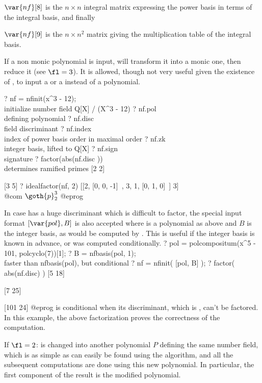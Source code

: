 $\var{nf}[8]$ is the $n\times n$ integral matrix expressing the power
basis in terms of the integral basis, and finally

$\var{nf}[9]$ is the $n\times n^2$ matrix giving the multiplication table
of the integral basis.

If a non monic polynomial is input,  will transform it into a
monic one, then reduce it (see $\fl=3$). It is allowed, though not very
useful given the existence of , to input a  or a
 instead of a polynomial.

\bprog
? nf = nfinit(x^3 - 12); \\ initialize number field Q[X] / (X^3 - 12)
? nf.pol   \\ defining polynomial
? nf.disc  \\ field discriminant
? nf.index \\ index of power basis order in maximal order
? nf.zk    \\ integer basis, lifted to Q[X]
? nf.sign  \\ signature
? factor(abs(nf.disc ))  \\ determines ramified primes
[2 2]

[3 5]
? idealfactor(nf, 2)
[[2, [0, 0, -1]~, 3, 1, [0, 1, 0]~] 3]  \\ @com $\goth{p}_2^3$
@eprog

In case  has a huge discriminant which is difficult to factor,
the special input format $[\var{pol},B]$ is also accepted where  is a
polynomial as above and $B$ is the integer basis, as would be computed by
. This is useful if the integer basis is known in advance,
or was computed conditionally.
\bprog
? pol = polcompositum(x^5 - 101, polcyclo(7))[1];
? B = nfbasis(pol, 1);   \\ faster than nfbasis(pol), but conditional
? nf = nfinit( [pol, B] );
? factor( abs(nf.disc) )
[5 18]

[7 25]

[101 24]
@eprog
 is conditional when its discriminant, which is , can't be
factored. In this example, the above factorization proves the correctness of
the computation.
\medskip

If $\fl=2$:  is changed into another polynomial $P$ defining the same
number field, which is as simple as can easily be found using the 
algorithm, and all the subsequent computations are done using this new
polynomial. In particular, the first component of the result is the modified
polynomial.

